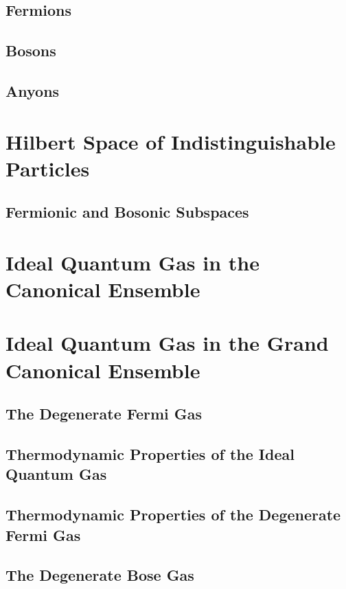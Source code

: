 \documentclass[12pt, a4paper, oneside, openright, titlepage]{book}
\begin{document}
\subsection{Fermions}

\subsection{Bosons}

\subsection{Anyons}

\section{Hilbert Space of Indistinguishable Particles}


\subsection{Fermionic and Bosonic Subspaces}

\section{Ideal Quantum Gas in the Canonical Ensemble}

\section{Ideal Quantum Gas in the Grand Canonical Ensemble}


\subsection{The Degenerate Fermi Gas}


\subsection{Thermodynamic Properties of the Ideal Quantum Gas}


\subsection{Thermodynamic Properties of the Degenerate Fermi Gas}


\subsection{The Degenerate Bose Gas}
\end{document}

